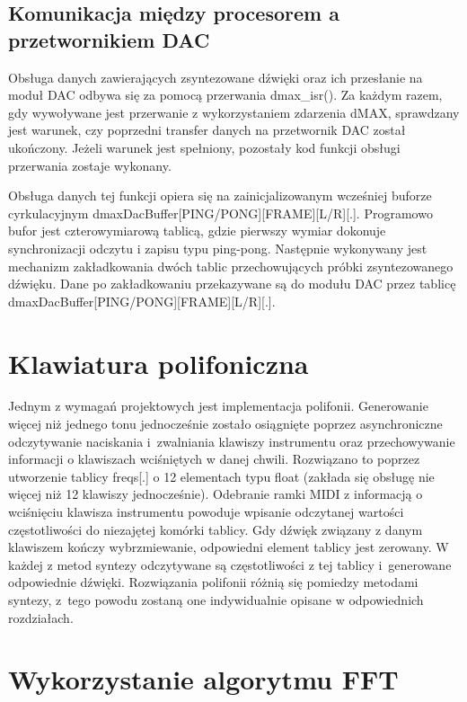 \subsection{Komunikacja między procesorem a przetwornikiem DAC}
Obsługa danych zawierających zsyntezowane dźwięki oraz ich przesłanie na moduł DAC odbywa się za pomocą przerwania dmax\_isr(). Za każdym razem, gdy wywoływane jest przerwanie z wykorzystaniem zdarzenia dMAX, sprawdzany jest warunek, czy poprzedni transfer danych na przetwornik DAC został ukończony. Jeżeli warunek jest spełniony, pozostały kod funkcji obsługi przerwania zostaje wykonany.

Obsługa danych tej funkcji opiera się na zainicjalizowanym wcześniej buforze cyrkulacyjnym dmaxDacBuffer[PING/PONG][FRAME][L/R][.]. Programowo bufor jest czterowymiarową tablicą, gdzie pierwszy wymiar dokonuje synchronizacji odczytu i zapisu typu ping-pong. Następnie wykonywany jest mechanizm zakładkowania dwóch tablic przechowujących próbki zsyntezowanego dźwięku. Dane po zakładkowaniu przekazywane są do modułu DAC przez tablicę dmaxDacBuffer[PING/PONG][FRAME][L/R][.].

\section{Klawiatura polifoniczna}\label{section:real_polifonia}
Jednym z wymagań projektowych jest implementacja polifonii. Generowanie więcej niż jednego tonu jednocześnie zostało osiągnięte poprzez asynchroniczne odczytywanie naciskania i~zwalniania klawiszy instrumentu oraz przechowywanie informacji o klawiszach wciśniętych w danej chwili. Rozwiązano to poprzez utworzenie tablicy freqs[.] o 12 elementach typu float (zakłada się obsługę nie więcej niż 12 klawiszy jednocześnie). Odebranie ramki MIDI z informacją o wciśnięciu klawisza instrumentu powoduje wpisanie odczytanej wartości częstotliwości do niezajętej komórki tablicy. Gdy dźwięk związany z danym klawiszem kończy wybrzmiewanie, odpowiedni element tablicy jest zerowany. W każdej z metod syntezy odczytywane są częstotliwości z tej tablicy i~generowane odpowiednie dźwięki. Rozwiązania polifonii różnią się pomiedzy metodami syntezy, z~tego powodu zostaną one indywidualnie opisane w odpowiednich rozdziałach.



\section{Wykorzystanie algorytmu FFT}

